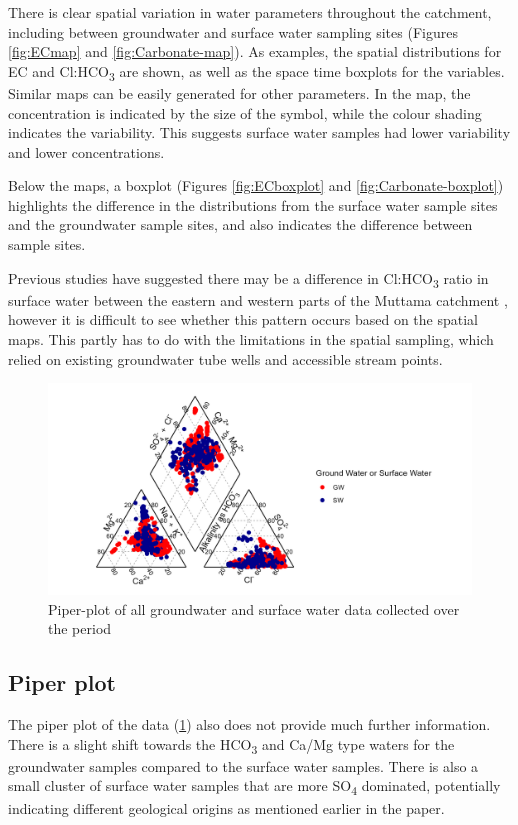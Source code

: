 \documentclass[, manuscript]{copernicus}
\begin{document}
There is clear spatial variation in water parameters throughout the
catchment, including between groundwater and surface water sampling
sites (Figures \ref{fig:ECmap} and \ref{fig:Carbonate-map}). As
examples, the spatial distributions for EC and Cl:HCO\textsubscript{3}
are shown, as well as the space time boxplots for the variables. Similar
maps can be easily generated for other parameters. In the map, the
concentration is indicated by the size of the symbol, while the colour
shading indicates the variability. This suggests surface water samples
had lower variability and lower concentrations.

Below the maps, a boxplot (Figures \ref{fig:ECboxplot} and
\ref{fig:Carbonate-boxplot}) highlights the difference in the
distributions from the surface water sample sites and the groundwater
sample sites, and also indicates the difference between sample sites.

Previous studies have suggested there may be a difference in
Cl:HCO\textsubscript{3} ratio in surface water between the eastern and
western parts of the Muttama catchment \citep{Conyers2008}, however it
is difficult to see whether this pattern occurs based on the spatial
maps. This partly has to do with the limitations in the spatial
sampling, which relied on existing groundwater tube wells and accessible
stream points.

\begin{figure}
\includegraphics[width=0.8\linewidth]{Figures/piper_plot} \caption{Piper-plot of all groundwater and surface water data collected over the period}\label{fig:piperplot}
\end{figure}

\subsection{Piper plot}

The piper plot of the data (\ref{fig:piperplot}) also does not provide
much further information. There is a slight shift towards the
HCO\textsubscript{3} and Ca/Mg type waters for the groundwater samples
compared to the surface water samples. There is also a small cluster of
surface water samples that are more SO\textsubscript{4} dominated,
potentially indicating different geological origins as mentioned earlier
in the paper.
\end{document}
